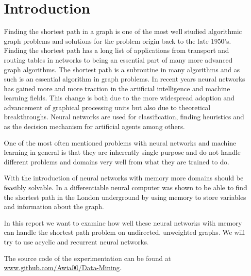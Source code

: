 
\section{Introduction}
Finding the shortest path in a graph is one of the most well studied algorithmic graph problems and solutions for the problem origin back to the late 1950's. Finding the shortest path has a long list of applications from transport and routing tables in networks to being an essential part of many more advanced graph algorithms. The shortest path is a subroutine in many algorithms and as such is an essential algorithm in graph problems. In recent years neural networks has gained more and more traction in the artificial intelligence and machine learning fields. This change is both due to the more widespread adoption and advancement of graphical processing units but also due to theoretical breakthroughs. Neural networks are used for classification, finding heuristics and as the decision mechanism for artificial agents among others.

\newpar One of the most often mentioned problems with neural networks and machine learning in general is that they are inherently single purpose and do not handle different problems and domains very well from what they are trained to do.

\newpar With the introduction of neural networks with memory more domains should be feasibly solvable. In \cite{graves2016hybrid} a differentiable neural computer was shown to be able to find the shortest path in the London underground by using memory to store variables and information about the graph.

\newpar In this report we want to examine how well these neural networks with memory can handle the shortest path problem on undirected, unweighted graphs. We will try to use acyclic and recurrent neural networks.

\newpar The source code of the experimentation can be found at\\ \href{https://github.com/Awia00/Data-Mining/tree/master/Group%20Project/NeatBFS/src/NeatBFS}{www.github.com/Awia00/Data-Mining}.